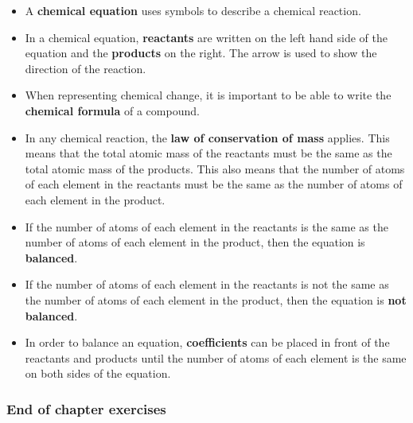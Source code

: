       
      \label{m38727*id67171}\begin{itemize}[noitemsep]
            \label{m38727*uid36}\item A \textbf{chemical equation} uses symbols to describe a chemical reaction.
\label{m38727*uid37}\item In a chemical equation, \textbf{reactants} are written on the left hand side of the equation and the \textbf{products} on the right. The arrow is used to show the direction of the reaction.
\label{m38727*uid38}\item When representing chemical change, it is important to be able to write the \textbf{chemical formula} of a compound.
\label{m38727*uid39}\item In any chemical reaction, the \textbf{law of conservation of mass} applies. This means that the total atomic mass of the reactants must be the same as the total atomic mass of the products. This also means that the number of atoms of each element in the reactants must be the same as the number of atoms of each element in the product.
\label{m38727*uid40}\item If the number of atoms of each element in the reactants is the same as the number of atoms of each element in the product, then the equation is \textbf{balanced}.
\label{m38727*uid41}\item If the number of atoms of each element in the reactants is not the same as the number of atoms of each element in the product, then the equation is \textbf{not balanced}.
\label{m38727*uid42}\item In order to balance an equation, \textbf{coefficients} can be placed in front of the reactants and products until the number of atoms of each element is the same on both sides of the equation.
\end{itemize}
        
\label{m38727*secfhsst!!!underscore!!!id1434}
            \subsubsection{ End of chapter exercises      }
            \nopagebreak
            
